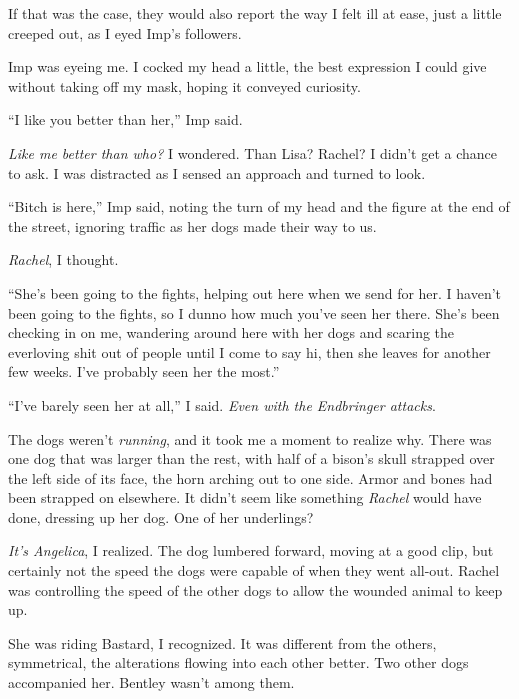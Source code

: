If that was the case, they would also report the way I felt ill at ease, just a little creeped out, as I eyed Imp's followers.



Imp was eyeing me.  I cocked my head a little, the best expression I could give without taking off my mask, hoping it conveyed curiosity.



``I like you better than her,'' Imp said.



\emph{Like me better than who?}  I wondered.  Than Lisa?  Rachel?  I didn't get a chance to ask.  I was distracted as I sensed an approach and turned to look.



``Bitch is here,'' Imp said, noting the turn of my head and the figure at the end of the street, ignoring traffic as her dogs made their way to us.



\emph{Rachel}, I thought.



``She's been going to the fights, helping out here when we send for her.  I haven't been going to the fights, so I dunno how much you've seen her there.  She's been checking in on me, wandering around here with her dogs and scaring the everloving shit out of people until I come to say hi, then she leaves for another few weeks.  I've probably seen her the most.''



``I've barely seen her at all,'' I said.  \emph{Even with the Endbringer attacks}.



The dogs weren't \emph{running}, and it took me a moment to realize why.  There was one dog that was larger than the rest, with half of a bison's skull strapped over the left side of its face, the horn arching out to one side.  Armor and bones had been strapped on elsewhere.  It didn't seem like something \emph{Rachel} would have done, dressing up her dog.  One of her underlings?



\emph{It's Angelica}, I realized.  The dog lumbered forward, moving at a good clip, but certainly not the speed the dogs were capable of when they went all-out.  Rachel was controlling the speed of the other dogs to allow the wounded animal to keep up.



She was riding Bastard, I recognized.  It was different from the others, symmetrical, the alterations flowing into each other better.  Two other dogs accompanied her.  Bentley wasn't among them.



